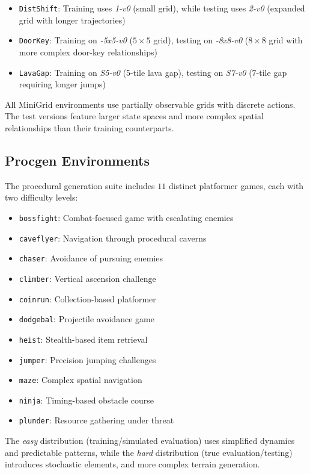 \begin{itemize}
\item \texttt{DistShift}: Training uses \textit{1-v0} (small grid), while testing uses \textit{2-v0} (expanded grid with longer trajectories)
\item \texttt{DoorKey}: Training on \textit{-5x5-v0} ($5\times5$ grid), testing on \textit{-8x8-v0} ($8\times8$ grid with more complex door-key relationships)
\item \texttt{LavaGap}: Training on \textit{S5-v0} (5-tile lava gap), testing on \textit{S7-v0} ($7$-tile gap requiring longer jumps)
\end{itemize}

All MiniGrid environments use partially observable grids with discrete actions. The test versions feature larger state spaces and more complex spatial relationships than their training counterparts.

\subsection{Procgen Environments}
The procedural generation suite includes $11$ distinct platformer games, each with two difficulty levels:

\begin{itemize}
\item \texttt{bossfight}: Combat-focused game with escalating enemies
\item \texttt{caveflyer}: Navigation through procedural caverns
\item \texttt{chaser}: Avoidance of pursuing enemies
\item \texttt{climber}: Vertical ascension challenge
\item \texttt{coinrun}: Collection-based platformer
\item \texttt{dodgebal}: Projectile avoidance game
\item \texttt{heist}: Stealth-based item retrieval
\item \texttt{jumper}: Precision jumping challenges
\item \texttt{maze}: Complex spatial navigation
\item \texttt{ninja}: Timing-based obstacle course
\item \texttt{plunder}: Resource gathering under threat
\end{itemize}

The \textit{easy} distribution (training/simulated evaluation) uses simplified dynamics and predictable patterns, while the \textit{hard} distribution (true evaluation/testing) introduces stochastic elements, and more complex terrain generation.

